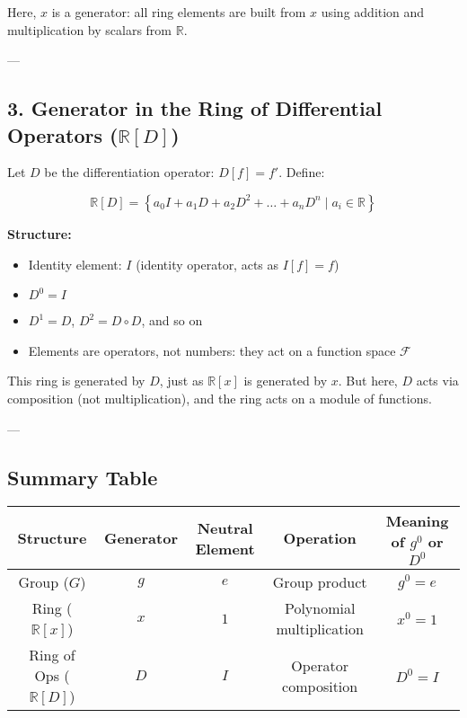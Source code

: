 \documentclass[12pt]{article}
\begin{document}
Here, $x$ is a generator: all ring elements are built from $x$ using addition and multiplication by scalars from $\mathbb{R}$.

---

\subsection*{3. Generator in the Ring of Differential Operators ($\mathbb{R}[D]$)}

Let $D$ be the differentiation operator: $D[f] = f'$. Define:

\[
\mathbb{R}[D] = \left\{ a_0 I + a_1 D + a_2 D^2 + \dots + a_n D^n \mid a_i \in \mathbb{R} \right\}
\]

\textbf{Structure:}
\begin{itemize}
	\item Identity element: $I$ (identity operator, acts as $I[f] = f$)
	\item $D^0 = I$
	\item $D^1 = D$, $D^2 = D \circ D$, and so on
	\item Elements are operators, not numbers: they act on a function space $\mathcal{F}$
\end{itemize}

This ring is generated by $D$, just as $\mathbb{R}[x]$ is generated by $x$. But here, $D$ acts via composition (not multiplication), and the ring acts on a module of functions.

---

\subsection*{Summary Table}

\begin{center}
	\begin{tabular}{|c|c|c|c|c|}
		\hline
		\textbf{Structure} & \textbf{Generator} & \textbf{Neutral Element} & \textbf{Operation} & \textbf{Meaning of $g^0$ or $D^0$} \\\hline
		Group ($G$) & $g$ & $e$ & Group product & $g^0 = e$ \\\hline
		Ring ($\mathbb{R}[x]$) & $x$ & $1$ & Polynomial multiplication & $x^0 = 1$ \\\hline
		Ring of Ops ($\mathbb{R}[D]$) & $D$ & $I$ & Operator composition & $D^0 = I$ \\\hline
	\end{tabular}
\end{center}
\end{document}
